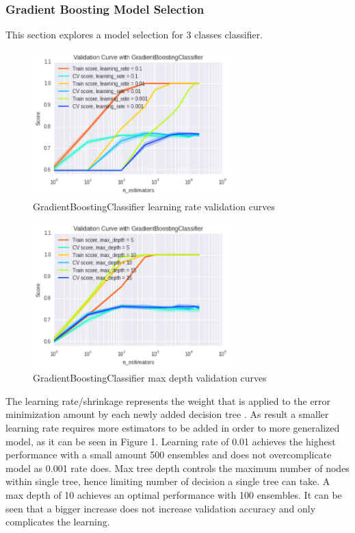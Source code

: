 \subsubsection{Gradient Boosting Model Selection}
This section explores a model selection for 3 classes classifier.

\begin{figure}[h]
\centering
\includegraphics[width=3.0in]{figures/v_curve1}
\caption{GradientBoostingClassifier learning rate validation curves} 
\label{fig:gradient1}
\end{figure}

\begin{figure}[h]
\centering
\includegraphics[width=3.0in]{figures/v_curve2}
\caption{GradientBoostingClassifier max depth validation curves}
\label{fig:gradient2}
\end{figure}

The learning rate/shrinkage represents the weight that is applied to the error minimization amount by each newly added decision tree \cite{biasvariance}. As result a smaller learning rate requires more estimators to be added in order to more generalized model, as it can be seen in Figure 1. Learning rate of 0.01 achieves the highest performance with a small amount 500 ensembles and does not overcomplicate model as 0.001 rate does. Max tree depth controls the maximum number of nodes within single tree, hence limiting number of decision a single tree can take. A max depth of 10 achieves an optimal performance with 100 ensembles. It can be seen that a bigger increase does not increase validation accuracy and only complicates the learning. 

